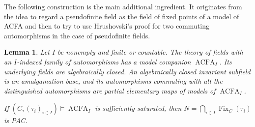 \documentclass[11pt,a4paper]{amsart}
\newtheorem{lemma}[theorem]{Lemma}
\theoremstyle{definition}
\DeclareMathOperator{\Fix}{Fix}
\begin{document}
The following construction is the main additional ingredient. It originates from the idea to regard a pseudofinite field as the field of fixed points of a model of ACFA and then to try to use Hrushovski's proof for two commuting automorphisms in the case of pseudofinite fields.
\begin{lemma}\label{b:lem:free}
Let $I$ be nonempty and finite or countable. The theory of fields with
an $I$-indexed family of automorphisms has a model companion $\operatorname{ACFA}_I$.
Its underlying fields are algebraically closed. An algebraically closed
invariant subfield is an amalgamation base, and its automorphisms
commuting with all the distinguished automorphisms are partial
elementary maps of models of $\operatorname{ACFA}_I$.

If $(C,(\tau_i)_{i\in I})\models \operatorname{ACFA}_I$ is sufficiently saturated,
then $N=\bigcap_{i\in I}\Fix_C(\tau_i)$ is PAC.
\end{lemma}
\end{document}

